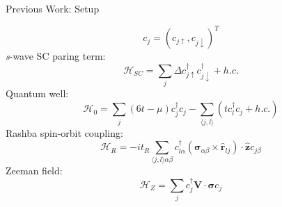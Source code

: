 \documentclass[xcolor=dvipsnames,10pt,aspectratio=169]{beamer}
\let\oldhat\hat
\renewcommand{\hat}[1]{\oldhat{\mathbf{#1}}}
\renewcommand{\vec}[1]{\mathbf{#1}}
\newcommand{\ham}{\mathcal{H}}
\newcommand{\cc}{c^{\dagger}}
\newcommand{\de}{\Delta}
\newcommand{\PW}{Previous Work}
\begin{document}
  \begin{frame}{\PW: Setup}
    \begin{multicols}{2}
      \centering
      \small
      \begin{equation}
        c_j = (c_{j\uparrow}, c_{j\downarrow})^T
      \end{equation}
      \textit{s}-wave SC paring term:
      \begin{equation}
        \ham_{SC} = \sum_j \de \cc_{j\uparrow} \cc_{j\downarrow} + h.c.
      \end{equation}
      Quantum well:
      \begin{equation}
        \ham_0 = \sum_j (6t - \mu) \cc_j c_j - \sum_{\langle j,l \rangle} (t \cc_l c_j + h.c.)
      \end{equation}
      Rashba spin-orbit coupling:
      \begin{equation}
        \ham_R = -it_R \sum_{\langle j,l \rangle \alpha\beta} \cc_{l\alpha} (\bm{\sigma}_{\alpha\beta} \times \hat{r}_{lj}) \cdot \hat{z} c_{j\beta}
      \end{equation}
      Zeeman field:
      \begin{equation}
        \ham_Z = \sum_j \cc_j \vec{V}\cdot \bm{\sigma} c_j
      \end{equation}

    \end{multicols}
  \end{frame}
\end{document}
